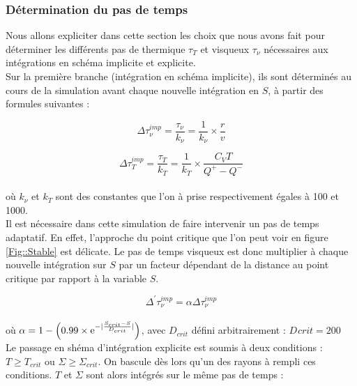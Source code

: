 \subsubsection{Détermination du pas de temps\label{sec::pas_de_temps}}
Nous allons expliciter dans cette section les choix que nous avons fait pour déterminer les différents pas de thermique $\tau_T$ et visqueux $\tau_\nu$ nécessaires aux intégrations en schéma implicite et explicite. \\


Sur la première branche (intégration en schéma implicite), ils sont déterminés au cours de la simulation avant chaque nouvelle intégration en $S$, à partir des formules suivantes : 

\begin{equation}
	\Delta \tau_\nu^{imp} = \frac{\tau_\nu}{k_{\nu}} = \frac{1}{k_{\nu}} \times \frac{r}{v}
\end{equation}

\begin{equation}
	\Delta \tau_{T}^{imp} = \frac{\tau_{T}}{k_{T}}= \frac{1}{k_{T}} \times \frac{C_{V} T}{Q^{+} - Q^{-}}
\end{equation} \\

où $k_{\nu}$ et $k_{T}$ sont des constantes que l'on à prise respectivement égales à 100 et 1000. \\


Il est nécessaire dans cette simulation de faire intervenir un pas de temps adaptatif. En effet, l'approche du point critique que l'on peut voir en figure \ref{Fig::Stable} est délicate. Le pas de temps visqueux est donc multiplier
à chaque nouvelle intégration sur $S$ par un facteur dépendant de la distance au point critique par rapport à la variable $S$. 


\begin{equation}
	\Delta^{'} \tau_{\nu}^{imp} = \alpha \Delta \tau_{\nu}^{imp}
\end{equation} \\

où $\alpha = 1 - \left( 0.99 \times \e^{- \lvert \frac{S_{crit} - S}{D_{crit}} \rvert} \right)$, avec $D_{crit}$ défini arbitrairement : $D_{}crit = 200$ \\

Le passage en shéma d'intégration explicite est soumis à deux conditions : $T \ge T_{crit}$ ou $\Sigma \ge \Sigma_{crit}$. On bascule dès lors qu'un des rayons à rempli ces conditions. $T$ et $\Sigma$ sont alors intégrés sur le même pas de temps :

